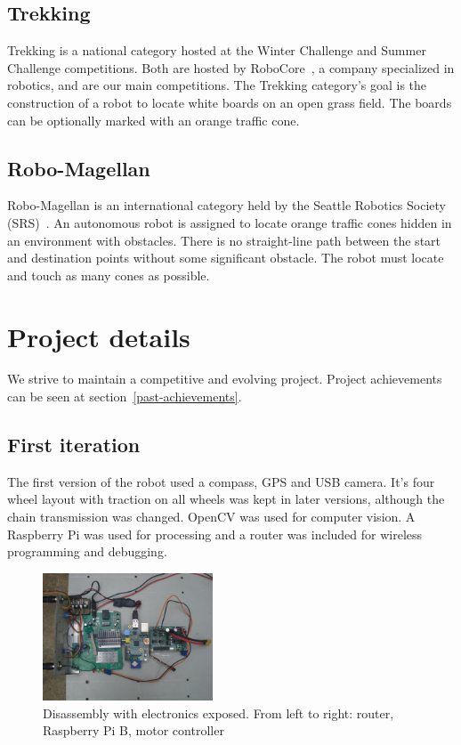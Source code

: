 \documentclass[conference]{IEEEtran}
\begin{document}
\subsection{Trekking}
Trekking is a national category hosted at the Winter Challenge and Summer
Challenge competitions. Both are hosted by RoboCore~\cite{RoboCore}, a company
specialized in robotics, and are our main competitions. The Trekking category's
goal is the construction of a robot to locate white boards on an open grass field.
The boards can be optionally marked with an orange traffic cone.
\subsection{Robo-Magellan}
Robo-Magellan is an international category held by the Seattle Robotics Society
(SRS)~\cite{SRS}. An autonomous robot is assigned to locate orange traffic cones
hidden in an environment with obstacles. There is no straight-line path between
the start and destination points without some significant obstacle. The robot
must locate and touch as many cones as possible.

\section{Project details}
\setcounter{subsection}{0}
We strive to maintain a competitive and evolving project. Project achievements
can be seen at section~\ref{past-achievements}.
\subsection{First iteration}
The first version of the robot used a compass, GPS and USB camera. It's four
wheel layout with traction on all wheels was kept in later versions, although
the chain transmission was changed. OpenCV was used for computer vision. A
Raspberry Pi was used for processing and a router was included for wireless
programming and debugging.

\begin{figure}[H]
    \centering
    \includegraphics[width=0.45\textwidth]{../Pictures/v1/WCX2014/DSC01671.JPG}
    \caption{Disassembly with electronics exposed. From left to right: router,
    Raspberry Pi B, motor controller}
\end{figure}
\end{document}
